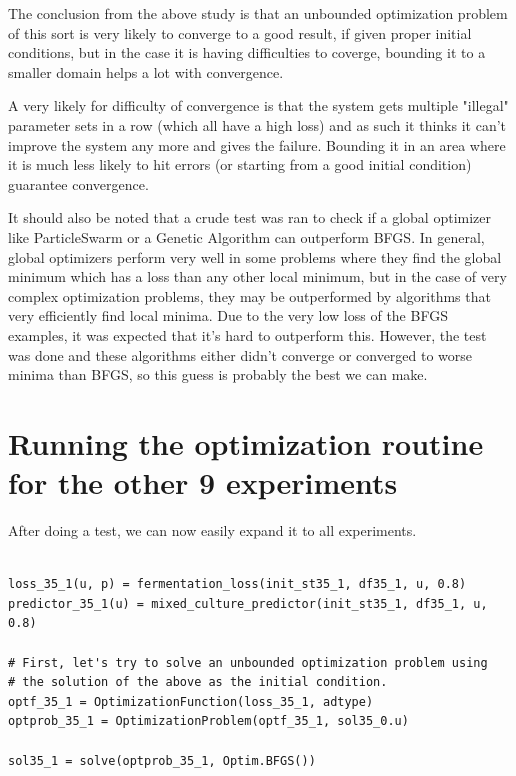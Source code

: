 \documentclass[11pt]{article}
\begin{document}
The conclusion from the above study is that an unbounded optimization problem of this sort is very likely to converge to a good result, if given proper initial conditions, but in the case it is having difficulties to coverge, bounding it to a smaller domain helps a lot with convergence.

A very likely for difficulty of convergence is that the system gets multiple "illegal" parameter sets in a row (which all have a high loss) and as such it thinks it can't improve the system any more and gives the failure. Bounding it in an area where it is much less likely to hit errors (or starting from a good initial condition) guarantee convergence.

It should also be noted that a crude test was ran to check if a global optimizer like ParticleSwarm or a Genetic Algorithm can outperform BFGS. In general, global optimizers perform very well in some problems where they find the global minimum which has a loss than any other local minimum, but in the case of very complex optimization problems, they may be outperformed by algorithms that very efficiently find local minima. Due to the very low loss of the BFGS examples, it was expected that it's hard to outperform this. However, the test was done and these algorithms either didn't converge or converged to worse minima than BFGS, so this guess is probably the best we can make.

\section{Running the optimization routine for the other 9 experiments}
\label{sec:org68566d4}
After doing a test, we can now easily expand it to all experiments.

\begin{verbatim}

loss_35_1(u, p) = fermentation_loss(init_st35_1, df35_1, u, 0.8)
predictor_35_1(u) = mixed_culture_predictor(init_st35_1, df35_1, u, 0.8)

# First, let's try to solve an unbounded optimization problem using
# the solution of the above as the initial condition.
optf_35_1 = OptimizationFunction(loss_35_1, adtype)
optprob_35_1 = OptimizationProblem(optf_35_1, sol35_0.u)

sol35_1 = solve(optprob_35_1, Optim.BFGS())
\end{verbatim}
\end{document}

